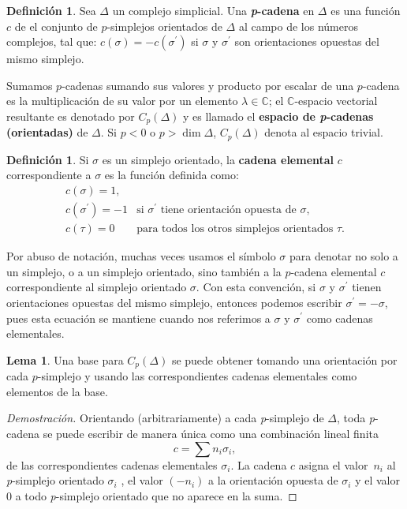 \documentclass[12pt]{book}
\theoremstyle{definition}
\newtheorem{definition}[theorem]{Definición}
\newtheorem{lemma}[theorem]{Lema}
\newcounter{in}
\newcounter{ini}
\begin{document}
\begin{definition}
  Sea $\Delta$ un complejo simplicial. Una \textbf{\emph{p}-cadena} en
  $\Delta$ es una función $c$ de el conjunto de $p$-simplejos
  orientados de
  $\Delta$ al campo de los números complejos, tal que:
    $c(\sigma)=-c(\sigma^{'})$ si $\sigma$ y $\sigma^{'}$ son
      orientaciones opuestas del mismo simplejo.
\end{definition}


Sumamos $p$-cadenas sumando sus valores y producto por escalar de una
$p$-cadena es la multiplicación de su valor por un elemento $\lambda\in\mathbb{C}$; el $\mathbb{C}$-espacio vectorial resultante es
denotado por $C_{p}(\Delta)$ y es llamado el \textbf{espacio de
  \emph{p}-cadenas (orientadas)} de $\Delta$. Si $p<0$ o $p>\dim \Delta$,
$C_{p}(\Delta)$ denota al espacio trivial.

\begin{definition}
  Si $\sigma$ es un simplejo orientado, la \textbf{cadena elemental} $c$
  correspondiente a $\sigma$ es la función definida como:
  \[ 
  \begin{array}{cl}
    c(\sigma)=1, & \\
    c(\sigma^{'})=-1 & \mbox{si $\sigma^{'}$ tiene orientación opuesta de $\sigma$}, \\
    c(\tau)=0 & \mbox{para todos los otros simplejos orientados $\tau$}. 
  \end{array}\] 
  \end{definition}

Por abuso de notación, muchas veces usamos el símbolo $\sigma$ para
denotar no solo a un simplejo, o a un simplejo orientado, sino también
a la $p$-cadena elemental $c$ correspondiente al simplejo orientado
$\sigma$. Con esta convención, si $\sigma$ y $\sigma^{'}$ tienen
orientaciones opuestas del mismo simplejo, entonces podemos escribir
$\sigma^{'}=-\sigma$, pues esta ecuación se mantiene cuando nos
referimos a $\sigma$ y $\sigma^{'}$ como cadenas elementales.

\begin{lemma}
   Una base para $C_{p}(\Delta)$ se puede obtener
   tomando una orientación por cada $p$-simplejo y usando las
   correspondientes cadenas elementales como elementos de la base.
\end{lemma}

\begin{proof}[Demostración]
  Orientando (arbitrariamente) a cada \emph{p}-simplejo de $\Delta$,
  toda \emph{p}-cadena se puede escribir de manera única como una
  combinación lineal finita
$$c=\sum n_{i}\sigma_{i},$$
de las correspondientes cadenas elementales $\sigma_{i}$. La cadena
$c$ asigna el valor~$n_{i}$ al \emph{p}-simplejo orientado
$\sigma_{i}$ , el valor $(-n_{i})$ a la orientación opuesta de
$\sigma_{i}$ y el valor $0$ a todo \emph{p}-simplejo orientado que no
aparece en la suma. 
\end{proof}
\end{document}
